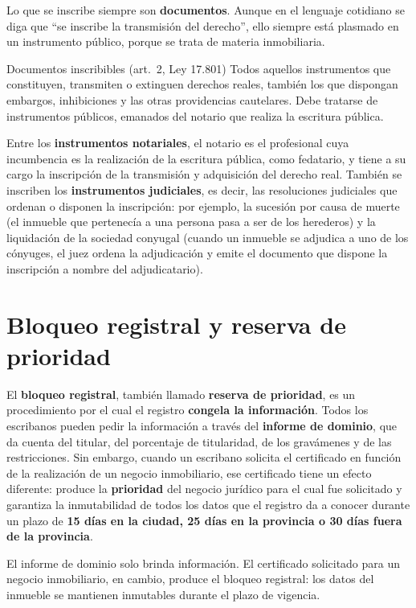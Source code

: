 \documentclass[12pt,oneside]{book}
\begin{document}
Lo que se inscribe siempre son \textbf{documentos}. Aunque en el lenguaje cotidiano se diga que ``se inscribe la transmisión del derecho'', ello siempre está plasmado en un instrumento público, porque se trata de materia inmobiliaria.

\begin{regla}{Documentos inscribibles (art.~2, Ley 17.801)}
Todos aquellos instrumentos que constituyen, transmiten o extinguen derechos reales, también los que dispongan embargos, inhibiciones y las otras providencias cautelares. Debe tratarse de instrumentos públicos, emanados del notario que realiza la escritura pública.
\end{regla}

Entre los \textbf{instrumentos notariales}, el notario es el profesional cuya incumbencia es la realización de la escritura pública, como fedatario, y tiene a su cargo la inscripción de la transmisión y adquisición del derecho real. También se inscriben los \textbf{instrumentos judiciales}, es decir, las resoluciones judiciales que ordenan o disponen la inscripción: por ejemplo, la sucesión por causa de muerte (el inmueble que pertenecía a una persona pasa a ser de los herederos) y la liquidación de la sociedad conyugal (cuando un inmueble se adjudica a uno de los cónyuges, el juez ordena la adjudicación y emite el documento que dispone la inscripción a nombre del adjudicatario).

\section{Bloqueo registral y reserva de prioridad}

El \textbf{bloqueo registral}, también llamado \textbf{reserva de prioridad}, es un procedimiento por el cual el registro \textbf{congela la información}. Todos los escribanos pueden pedir la información a través del \textbf{informe de dominio}, que da cuenta del titular, del porcentaje de titularidad, de los gravámenes y de las restricciones. Sin embargo, cuando un escribano solicita el certificado en función de la realización de un negocio inmobiliario, ese certificado tiene un efecto diferente: produce la \textbf{prioridad} del negocio jurídico para el cual fue solicitado y garantiza la inmutabilidad de todos los datos que el registro da a conocer durante un plazo de \textbf{15 días en la ciudad, 25 días en la provincia o 30 días fuera de la provincia}.

\begin{importante}
El informe de dominio solo brinda información. El certificado solicitado para un negocio inmobiliario, en cambio, produce el bloqueo registral: los datos del inmueble se mantienen inmutables durante el plazo de vigencia.
\end{importante}
\end{document}
